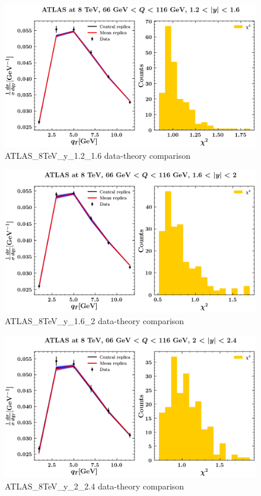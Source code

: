 \documentclass[
]{article}
\begin{document}
\begin{figure}
\centering
\includegraphics{pngplots/ATLAS_8TeV_y_1.2_1.6.png}
\caption{ATLAS\_8TeV\_y\_1.2\_1.6 data-theory comparison}
\end{figure}

\begin{figure}
\centering
\includegraphics{pngplots/ATLAS_8TeV_y_1.6_2.png}
\caption{ATLAS\_8TeV\_y\_1.6\_2 data-theory comparison}
\end{figure}

\begin{figure}
\centering
\includegraphics{pngplots/ATLAS_8TeV_y_2_2.4.png}
\caption{ATLAS\_8TeV\_y\_2\_2.4 data-theory comparison}
\end{figure}
\end{document}
